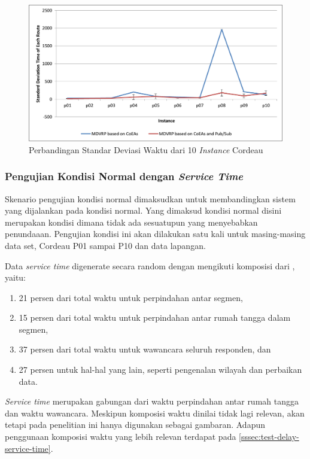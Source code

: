\begin{figure}[H]
	\centering
	\includegraphics[width=\textwidth]{Resources/Images/test_result_10_cordeau_standard_deviation}
	\caption{Perbandingan Standar Deviasi Waktu dari 10 \textit{Instance} Cordeau}
	\label{fig:test_result_10_cordeau_standard_deviation}
\end{figure}


\subsubsection{Pengujian Kondisi Normal dengan \textit{Service Time}}
\label{ssec:test-normal-service-time}
Skenario pengujian kondisi normal dimaksudkan untuk membandingkan sistem yang dijalankan pada kondisi normal. Yang dimaksud kondisi normal disini merupakan kondisi dimana tidak ada sesuatupun yang menyebabkan penundaaan. Pengujian kondisi ini akan dilakukan satu kali untuk masing-masing data set, Cordeau P01 sampai P10 dan data lapangan.


Data \textit{service time} digenerate secara random dengan mengikuti komposisi dari \citep{sudman_time_1965}, yaitu:
\begin{enumerate}
	\item 21 persen dari total waktu untuk perpindahan antar segmen, 
	\item 15 persen dari total waktu untuk perpindahan antar rumah tangga dalam segmen, 
	\item 37 persen dari total waktu untuk wawancara seluruh responden, dan 
	\item 27 persen untuk hal-hal yang lain, seperti pengenalan wilayah dan perbaikan data.
\end{enumerate}
\textit{Service time} merupakan gabungan dari waktu perpindahan antar rumah tangga dan waktu wawancara. Meskipun komposisi waktu \citep{sudman_time_1965} dinilai tidak lagi relevan, akan tetapi pada penelitian ini hanya digunakan sebagai gambaran. Adapun penggunaan komposisi waktu yang lebih relevan terdapat pada \autoref{sssec:test-delay-service-time}.


